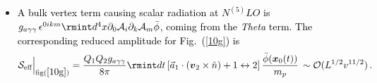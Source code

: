 \begin{itemize}
\item \textcolor{black}{A bulk vertex term causing scalar radiation at $N^{(5)}LO$ is $g_{a\gamma\gamma}\,\epsilon^{0ikm}\rmint d^4x \partial_{0}\mathcal{A}_{i}\partial_{k}\mathcal{A}_{m}\Bar{\phi}$, coming from the \textit{Theta} term. The corresponding reduced amplitude for Fig.~(\ref{10g}) is}
\begin{align}
    \begin{split}
          \mathcal{S}_{\text{eff}}\Big|_{\text{fig}(\ref{10g})}
          =\frac{Q_1 Q_2 g_{a\gamma\gamma}}{8\pi}\rmint dt \,[\Vec{a}_1\cdot (\boldsymbol{v}_2\times \Hat{n})+1\leftrightarrow 2]\,\frac{\Bar{\phi}(\boldsymbol{x}_0(t))}{m_p}\,\sim\mathcal{O}(L^{1/2}v^{11/2})\,.
\label{5.32m}
    \end{split}
\end{align}
\end{itemize}
